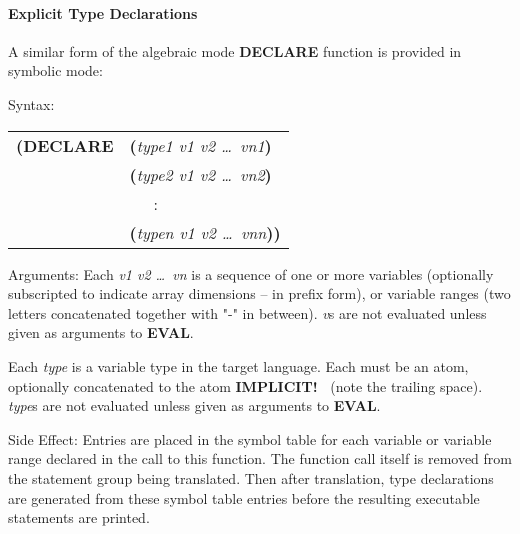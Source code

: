 \paragraph{Explicit Type Declarations}
A similar form of the algebraic mode {\bf DECLARE} function is provided in
symbolic mode:
\begin{describe}{Syntax:} 
\begin{tabular}{ll}
{\bf (DECLARE} & {\bf (}{\it type1 v1 v2 \dots\  vn1\/}{\bf )}\\
& {\bf (}{\it type2 v1 v2 \dots\  vn2\/}{\bf )}\\
& \ \ \ :\\
& {\bf (}{\it typen v1 v2 \dots\  vnn\/}{\bf )) }\\
\end{tabular}
\end{describe}
\begin{describe}{Arguments:}
Each {\it v1 v2 \dots\ vn\/} is a sequence of one or more variables
(optionally subscripted to indicate array dimensions -- in prefix form), or
variable ranges (two letters concatenated together with "-" in between). {\it
v\/}s are not evaluated unless given as arguments to {\bf EVAL}.

Each {\it type\/} is a variable type in the target language.  Each
must be an atom, optionally concatenated to the atom {\bf IMPLICIT!\ }
(note the trailing space).  
{\it type\/}s are not evaluated unless given as arguments to {\bf EVAL}.
\end{describe}
\begin{describe}{Side Effect:}
Entries are placed in the symbol table for each variable or
variable range declared in the call to this function.  The
function call itself is removed from the statement group
being translated.  Then after translation, type declarations are
generated from these symbol table entries before the resulting
executable statements are printed.
\end{describe}
